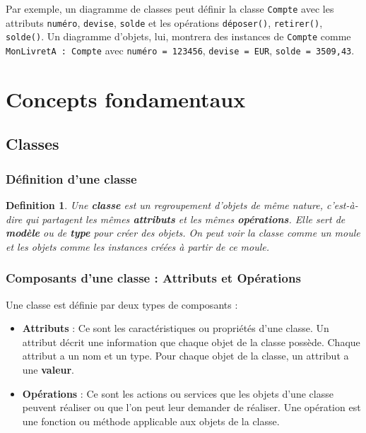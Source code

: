 \documentclass{article}
\newtheorem{definition}{Definition}
\begin{document}
Par exemple, un diagramme de classes peut définir la classe \texttt{Compte} avec les attributs \texttt{numéro}, \texttt{devise}, \texttt{solde} et les opérations \texttt{déposer()}, \texttt{retirer()}, \texttt{solde()}. Un diagramme d'objets, lui, montrera des instances de \texttt{Compte} comme \texttt{MonLivretA : Compte} avec \texttt{numéro = 123456}, \texttt{devise = EUR}, \texttt{solde = 3509,43}.


\section{Concepts fondamentaux}

\subsection{Classes}

\subsubsection{Définition d'une classe}
\begin{definition}
Une \textbf{classe} est un regroupement d'objets de même nature, c'est-à-dire qui partagent les mêmes \textbf{attributs} et les mêmes \textbf{opérations}. Elle sert de \textbf{modèle} ou de \textbf{type} pour créer des objets.  On peut voir la classe comme un moule et les objets comme les instances créées à partir de ce moule.
\end{definition}

\subsubsection{Composants d'une classe : Attributs et Opérations}
Une classe est définie par deux types de composants :

\begin{itemize}
    \item \textbf{Attributs} :  Ce sont les caractéristiques ou propriétés d'une classe. Un attribut décrit une information que chaque objet de la classe possède. Chaque attribut a un nom et un type. Pour chaque objet de la classe, un attribut a une \textbf{valeur}.
    \item \textbf{Opérations} : Ce sont les actions ou services que les objets d'une classe peuvent réaliser ou que l'on peut leur demander de réaliser. Une opération est une fonction ou méthode applicable aux objets de la classe.
\end{itemize}
\end{document}
